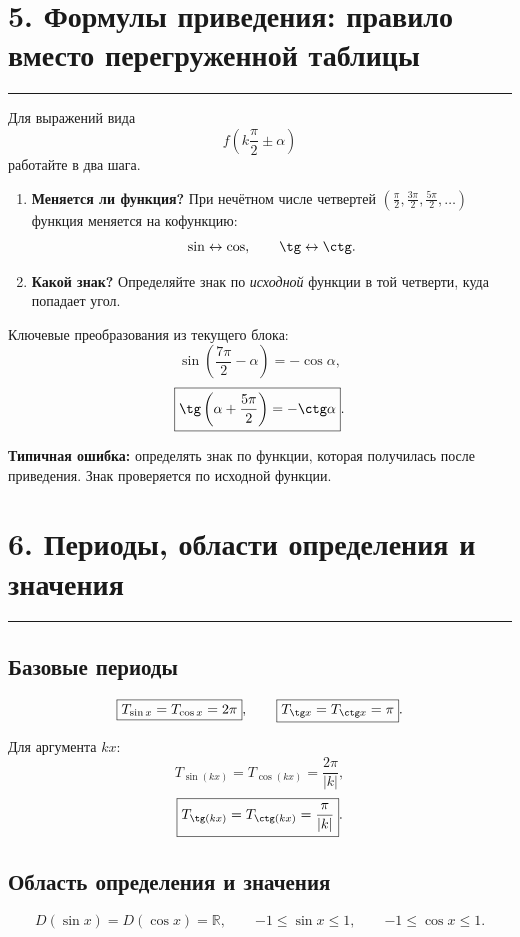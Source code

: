 \documentclass[a4paper,12pt]{article}
\newcommand{\sectionline}{\vspace{-1mm}\noindent\color{accent}\rule{\linewidth}{0.7pt}\color{textgray}\vspace{2mm}}
\newcommand{\key}[1]{\textbf{\color{darkaccent}#1}}
\newcommand{\R}{\mathbb{R}}
\begin{document}
\begin{center}
\end{center}

\section*{5. Формулы приведения: правило вместо перегруженной таблицы}
\sectionline

Для выражений вида
\[
f\!\left(k\frac\pi2\pm\alpha\right)
\]
работайте в два шага.

\begin{enumerate}
  \item \key{Меняется ли функция?} При нечётном числе четвертей
  $\left(\frac\pi2,\frac{3\pi}{2},\frac{5\pi}{2},\ldots\right)$ функция меняется на кофункцию:
  \[
  \sin\leftrightarrow\cos,
  \qquad
  \tg\leftrightarrow\ctg.
  \]
  \item \key{Какой знак?} Определяйте знак по \emph{исходной} функции в той четверти, куда попадает угол.
\end{enumerate}

Ключевые преобразования из текущего блока:
\[
\boxed{\sin\left(\frac{7\pi}{2}-\alpha\right)=-\cos\alpha},
\]
\[
\boxed{\tg\left(\alpha+\frac{5\pi}{2}\right)=-\ctg\alpha}.
\]

\key{Типичная ошибка:} определять знак по функции, которая получилась после приведения. Знак проверяется по исходной функции.

\section*{6. Периоды, области определения и значения}
\sectionline

\subsection*{Базовые периоды}
\[
\boxed{T_{\sin x}=T_{\cos x}=2\pi},
\qquad
\boxed{T_{\tg x}=T_{\ctg x}=\pi}.
\]

Для аргумента $kx$:
\[
\boxed{T_{\sin(kx)}=T_{\cos(kx)}=\frac{2\pi}{|k|}},
\]
\[
\boxed{T_{\tg(kx)}=T_{\ctg(kx)}=\frac{\pi}{|k|}}.
\]

\subsection*{Область определения и значения}
\[
\boxed{D(\sin x)=D(\cos x)=\R},
\qquad
\boxed{-1\le\sin x\le1},
\qquad
\boxed{-1\le\cos x\le1}.
\]
\end{document}
